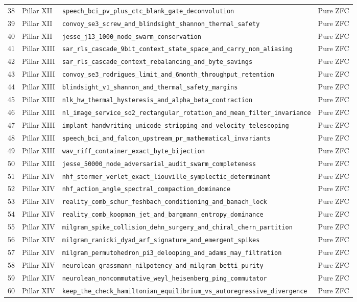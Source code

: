 \documentclass[11pt,letterpaper]{article}
\newcommand{\lean}[1]{\nolinkurl{#1}}
\theoremstyle{definition}
\begin{document}
\begin{footnotesize}
\begin{longtable}{@{}rl>{\raggedright\arraybackslash}p{3.95in}l@{}}
38 & Pillar XII & \lean{speech_bci_pv_plus_ctc_blank_gate_deconvolution} & Pure ZFC \\
39 & Pillar XII & \lean{convoy_se3_screw_and_blindsight_shannon_thermal_safety} & Pure ZFC \\
40 & Pillar XII & \lean{jesse_j13_1000_node_swarm_conservation} & Pure ZFC \\
41 & Pillar XIII & \lean{sar_rls_cascade_9bit_context_state_space_and_carry_non_aliasing} & Pure ZFC \\
42 & Pillar XIII & \lean{sar_rls_cascade_context_rebalancing_and_byte_savings} & Pure ZFC \\
43 & Pillar XIII & \lean{convoy_se3_rodrigues_limit_and_6month_throughput_retention} & Pure ZFC \\
44 & Pillar XIII & \lean{blindsight_v1_shannon_and_thermal_safety_margins} & Pure ZFC \\
45 & Pillar XIII & \lean{nlk_hw_thermal_hysteresis_and_alpha_beta_contraction} & Pure ZFC \\
46 & Pillar XIII & \lean{nl_image_service_so2_rectangular_rotation_and_mean_filter_invariance} & Pure ZFC \\
47 & Pillar XIII & \lean{implant_handwriting_unicode_stripping_and_velocity_telescoping} & Pure ZFC \\
48 & Pillar XIII & \lean{speech_bci_and_falcon_upstream_pr_mathematical_invariants} & Pure ZFC \\
49 & Pillar XIII & \lean{wav_riff_container_exact_byte_bijection} & Pure ZFC \\
50 & Pillar XIII & \lean{jesse_50000_node_adversarial_audit_swarm_completeness} & Pure ZFC \\
51 & Pillar XIV & \lean{nhf_stormer_verlet_exact_liouville_symplectic_determinant} & Pure ZFC \\
52 & Pillar XIV & \lean{nhf_action_angle_spectral_compaction_dominance} & Pure ZFC \\
53 & Pillar XIV & \lean{reality_comb_schur_feshbach_conditioning_and_banach_lock} & Pure ZFC \\
54 & Pillar XIV & \lean{reality_comb_koopman_jet_and_bargmann_entropy_dominance} & Pure ZFC \\
55 & Pillar XIV & \lean{milgram_spike_collision_dehn_surgery_and_chiral_chern_partition} & Pure ZFC \\
56 & Pillar XIV & \lean{milgram_ranicki_dyad_arf_signature_and_emergent_spikes} & Pure ZFC \\
57 & Pillar XIV & \lean{milgram_permutohedron_pi3_delooping_and_adams_may_filtration} & Pure ZFC \\
58 & Pillar XIV & \lean{neurolean_grassmann_nilpotency_and_milgram_betti_purity} & Pure ZFC \\
59 & Pillar XIV & \lean{neurolean_noncommutative_weyl_heisenberg_ping_commutator} & Pure ZFC \\
60 & Pillar XIV & \lean{keep_the_check_hamiltonian_equilibrium_vs_autoregressive_divergence} & Pure ZFC \\
\end{longtable}
\end{footnotesize}
\end{document}
